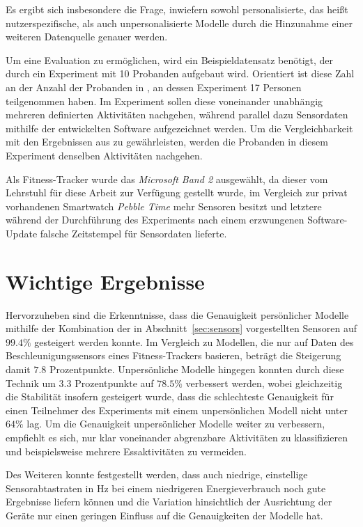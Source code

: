 Es ergibt sich insbesondere die Frage, inwiefern sowohl personalisierte, das heißt nutzerspezifische, als auch unpersonalisierte Modelle durch die Hinzunahme einer weiteren Datenquelle genauer werden.

Um eine Evaluation zu ermöglichen, wird ein Beispieldatensatz benötigt, der durch ein Experiment mit 10 Probanden aufgebaut wird. Orientiert ist diese Zahl an der Anzahl der Probanden in \cite{Weiss2016}, an dessen Experiment 17 Personen teilgenommen haben. Im Experiment sollen diese voneinander unabhängig mehreren definierten Aktivitäten nachgehen, während parallel dazu Sensordaten mithilfe der entwickelten Software aufgezeichnet werden. Um die Vergleichbarkeit mit den Ergebnissen aus \cite{Weiss2016} zu gewährleisten, werden die Probanden in diesem Experiment denselben Aktivitäten nachgehen.

Als Fitness-Tracker wurde das \textit{Microsoft Band 2} ausgewählt, da dieser vom Lehrstuhl für diese Arbeit zur Verfügung gestellt wurde, im Vergleich zur privat vorhandenen Smartwatch \textit{Pebble Time} mehr Sensoren besitzt und letztere während der Durchführung des Experiments nach einem erzwungenen Software-Update falsche Zeitstempel für Sensordaten lieferte. 

\section{Wichtige Ergebnisse}
Hervorzuheben sind die Erkenntnisse, dass die Genauigkeit persönlicher Modelle mithilfe der Kombination der in Abschnitt~\ref{sec:sensors} vorgestellten Sensoren auf $99.4 \%$ gesteigert werden konnte. Im Vergleich zu Modellen, die nur auf Daten des Beschleunigungssensors eines Fitness-Trackers basieren, beträgt die Steigerung damit $7.8$ Prozentpunkte. Unpersönliche Modelle hingegen konnten durch diese Technik um $3.3$ Prozentpunkte auf $78.5 \%$ verbessert werden, wobei gleichzeitig die Stabilität insofern gesteigert wurde, dass die schlechteste Genauigkeit für einen Teilnehmer des Experiments mit einem unpersönlichen Modell nicht unter $64 \%$ lag. Um die Genauigkeit unpersönlicher Modelle weiter zu verbessern, empfiehlt es sich, nur klar voneinander abgrenzbare Aktivitäten zu klassifizieren und beispielsweise mehrere Essaktivitäten zu vermeiden.

Des Weiteren konnte festgestellt werden, dass auch niedrige, einstellige Sensorabtastraten in Hz bei einem niedrigeren Energieverbrauch noch gute Ergebnisse liefern können und die Variation hinsichtlich der Ausrichtung der Geräte nur einen geringen Einfluss auf die Genauigkeiten der Modelle hat.

